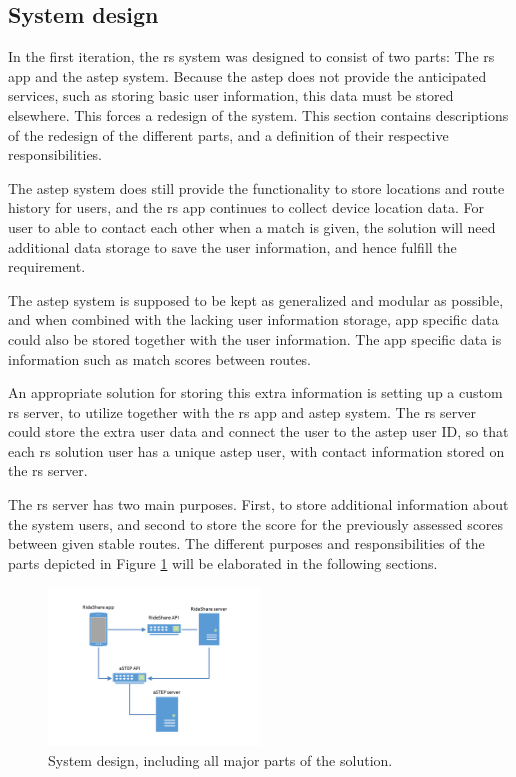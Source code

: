 \subsection{System design}\label{sec:s2systemdesign}
In the first iteration, the \gls{rs} system was designed to consist of two parts: The \gls{rs} app and the \gls{astep} system.
Because the \gls{astep} does not provide the anticipated services, such as storing basic user information, this data must be stored elsewhere.
This forces a redesign of the system.
This section contains descriptions of the redesign of the different parts, and a definition of their respective responsibilities.


The \gls{astep} system does still provide the functionality to store locations and route history for users, and the \gls{rs} app continues to collect device location data.  
For user to able to contact each other when a match is given, the solution will need additional data storage to save the user information, and hence fulfill the requirement.


The \gls{astep} system is supposed to be kept as generalized and modular as possible, and when combined with the lacking user information storage, app specific data could also be stored together with the user information.
The app specific data is information such as match scores between routes.


An appropriate solution for storing this extra information is setting up a custom \gls{rs} server, to utilize together with the \gls{rs} app and \gls{astep} system.
The \gls{rs} server could store the extra user data and connect the user to the \gls{astep} user ID, so that each \gls{rs} solution user has a unique \gls{astep} user, with contact information stored on the \gls{rs} server.

The \gls{rs} server has two main purposes.
First, to store additional information about the system users, and second to store the score for the previously assessed scores between given stable routes.
The different purposes and responsibilities of the parts depicted in Figure \ref{fig:s2systemdesign} will be elaborated in the following sections.
\begin{figure}
	\vspace{-12pt}
	\centering
	\includegraphics[width=0.5\textwidth,trim={4cm 2cm 4cm 2cm},clip]{figures/SystemDesign.png}
	\caption{System design, including all major parts of the solution.}
	\vspace{-12pt}
	\label{fig:s2systemdesign}
\end{figure}

